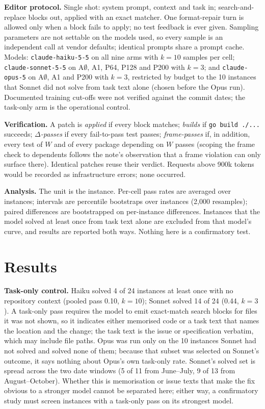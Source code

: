 \documentclass[10pt]{article}
\begin{document}
\textbf{Editor protocol.} Single shot: system prompt, context and task in; search-and-replace blocks out, applied with an exact matcher. One format-repair turn is allowed only when a block fails to apply; no test feedback is ever given. Sampling parameters are not settable on the models used, so every sample is an independent call at vendor defaults; identical prompts share a prompt cache. Models: \texttt{claude-haiku-5-5} on all nine arms with $k=10$ samples per cell; \texttt{claude-sonnet-5-5} on A$\emptyset$, A1, P64, P128 and P200 with $k=3$; and \texttt{claude-opus-5} on A$\emptyset$, A1 and P200 with $k=3$, restricted by budget to the 10 instances that Sonnet did not solve from task text alone (chosen before the Opus run). Documented training cut-offs were not verified against the commit dates; the task-only arm is the operational control.

\textbf{Verification.} A patch is \emph{applied} if every block matches; \emph{builds} if \texttt{go build ./...} succeeds; \emph{$\Delta$-passes} if every fail-to-pass test passes; \emph{frame-passes} if, in addition, every test of $W$ and of every package depending on $W$ passes (scoping the frame check to dependents follows the note's observation that a frame violation can only surface there). Identical patches reuse their verdict. Requests above 900k tokens would be recorded as infrastructure errors; none occurred.

\textbf{Analysis.} The unit is the instance. Per-cell pass rates are averaged over instances; intervals are percentile bootstraps over instances (2,000 resamples); paired differences are bootstrapped on per-instance differences. Instances that the model solved at least once from task text alone are excluded from that model's curve, and results are reported both ways. Nothing here is a confirmatory test.

\section{Results}

\textbf{Task-only control.} Haiku solved 4 of 24 instances at least once with no repository context (pooled pass 0.10, $k=10$); Sonnet solved 14 of 24 (0.44, $k=3$). A task-only pass requires the model to emit exact-match search blocks for files it was not shown, so it indicates either memorised code or a task text that names the location and the change; the task text is the issue or specification verbatim, which may include file paths. Opus was run only on the 10 instances Sonnet had not solved and solved none of them; because that subset was selected on Sonnet's outcome, it says nothing about Opus's own task-only rate. Sonnet's solved set is spread across the two date windows (5 of 11 from June--July, 9 of 13 from August--October). Whether this is memorisation or issue texts that make the fix obvious to a stronger model cannot be separated here; either way, a confirmatory study must screen instances with a task-only pass on its strongest model.
\end{document}
